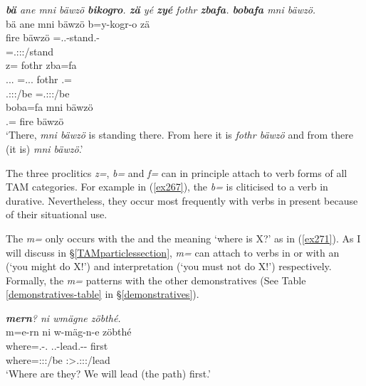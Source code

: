 \begin{exe}
	\ex \emph{\textbf{bä} ane mni bäwzö \textbf{bikogro}. \textbf{zä} yé \textbf{zyé} fothr \textbf{zbafa}. \textbf{bobafa} mni bäwzö.}\\
	\glll bä ane mni bäwzö b=y-kogr-o zä\\
	\Med{} \Dem{} fire bäwzö \Med=\Tsg.\Masc.\Alph-stand.\Ndu-\Andat{} \Prox{}\\
	{} {} {} {} \footnotesize{\Med=\Tsg.\Masc:\Sbj:\Nonpast:\Ipfv/stand} {}\\
	\sn
	\glll {} z= fothr zba=fa\\
	\Tsg.\Masc.\Cop.\Ndu{} \Prox=\Tsg.\Masc.\Cop.\Ndu{} fothr \Prox.\Abl=\Abl{}\\
	\footnotesize{\Tsg.\Masc:\Sbj:\Nonpast:\Ipfv/be} \footnotesize{\Prox=\Tsg.\Masc:\Sbj:\Nonpast:\Ipfv/be} {} {} {} {} {} {}\\
	\sn
	\gll boba=fa mni bäwzö\\
	\Med.\Abl=\Abl{} fire bäwzö\\
	\trans `There, \emph{mni bäwzö} is standing there. From here it is \emph{fothr bäwzö} and from there (it is) \emph{mni bäwzö}.' 
	\label{ex272}
\end{exe}

The three proclitics \emph{z=}, \emph{b=} and \emph{f=} can in principle attach to verb forms of all TAM categories. For example in (\ref{ex267}), the  \emph{b=} is cliticised to a verb in  durative. Nevertheless, they occur most frequently with verbs in present  because of their situational use.%

The  \emph{m=} only occurs with the  and the meaning `where is X?' as in (\ref{ex271}). As I will discuss in \S{}\ref{TAMparticlessection}, \emph{m=} can attach to verbs in  or   with an  (`you might do X!') and  interpretation (`you must not do X!') respectively. Formally, the \emph{m=}  patterns with the other demonstratives (See Table \ref{demonstratives-table} in \S{}\ref{demonstratives}).

\begin{exe}
	\ex \emph{\textbf{mern}? ni wmägne zöbthé.}\\
	\glll m=e-rn ni w-mäg-n-e zöbthé\\
	where=\Stnsg.\Alph-\Cop.\Du{} \Fnsg{} \Tsg.\F.\Alph-lead.\Ext-\Du-\Fnsg{} first\\
	\footnotesize{where=\Stdu:\Sbj:\Nonpast:\Ipfv/be} {} \footnotesize{\Fdu:\Sbj>\Tsg.\F:\Obj:\Nonpast:\Ipfv/lead} {}\\
	\trans `Where are they? We will lead (the path) first.' 
	\label{ex271}
\end{exe}